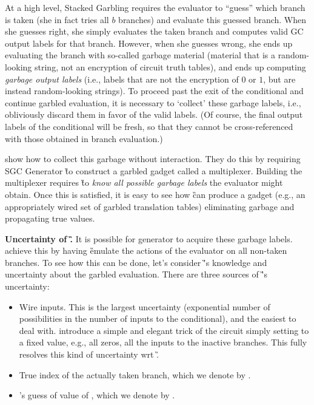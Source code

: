 At a high level, Stacked Garbling requires the evaluator to
``guess'' which branch is taken (she in fact tries  all $b$
branches) and evaluate this guessed branch.
When she guesses right, she simply evaluates the taken branch and
computes valid GC output labels for that branch.
However, when she guesses wrong, she ends up evaluating the branch
with so-called garbage material (material that is a random-looking string, not
an encryption of circuit truth tables), and ends up computing
\emph{garbage output labels} (i.e., labels that are not the encryption
of $0$ or $1$, but are instead random-looking strings).
%
To proceed past the exit of the conditional and continue garbled evaluation, it is necessary to
`collect'  these garbage labels, i.e., obliviously  discard them in favor of the valid
labels.  (Of course, the final output labels of the conditional will be fresh,  so that they cannot be cross-referenced with those obtained in branch evaluation.)


\HK show how to collect this garbage without
interaction.  They do this by requiring  SGC Generator \G to construct a
garbled gadget called a multiplexer.
Building the \HK multiplexer requires \G to {\em know all possible
garbage labels} the evaluator might obtain.  Once this is satisfied, it is easy to see how \G can produce a gadget (e.g., an appropriately wired set of garbled translation tables) eliminating garbage and propagating true values.


{\bf Uncertainty of \G.}
It is possible for generator to acquire these garbage labels.  \HK achieve this by having \G  emulate the actions of the
evaluator \E on all non-taken branches.  To see how this can be done, let's consider \G's knowledge and uncertainty about the garbled evaluation.  There are three sources of \G's uncertainty:
\begin{itemize}
	\item Wire inputs.  This is the largest uncertainty (exponential number of possibilities in the number of inputs to the conditional), and the easiest to deal with.  \HK introduce a simple and elegant trick of the circuit simply setting to a fixed value, e.g., all zeros, all the inputs to the inactive branches.  This fully resolves this kind of uncertainty wrt \G.
	\item True index of the actually taken branch, which we denote by \truth.
	\item \E's guess of value of \truth, which we denote by \guess.
\end{itemize}

